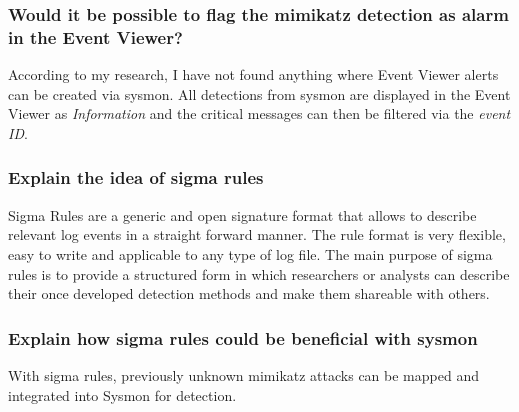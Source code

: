 \subsubsection{Would it be possible to flag the mimikatz detection as alarm in the Event Viewer?}
According to my research, I have not found anything where Event Viewer alerts can be created via sysmon. All detections from sysmon are displayed in the Event Viewer as \textit{Information}\color{black} and the critical messages can then be filtered via the \textit{event ID}.

\subsubsection{Explain the idea of sigma rules}
Sigma Rules are a generic and open signature format that allows to describe relevant log events in a straight forward manner. The rule format is very flexible, easy to write and applicable to any type of log file. The main purpose of sigma rules is to provide a structured form in which researchers or analysts can describe their once developed detection methods and make them shareable with others.

\subsubsection{Explain how sigma rules could be beneficial with sysmon}
With sigma rules, previously unknown mimikatz attacks can be mapped and integrated into Sysmon for detection.
